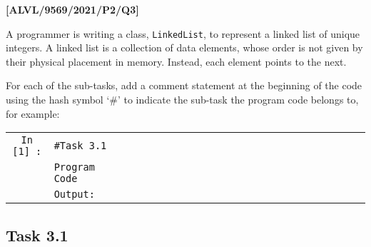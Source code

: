 \item \textbf{{[}ALVL/9569/2021/P2/Q3{]} }

A programmer is writing a class, \texttt{LinkedList}, to represent
a linked list of unique integers. A linked list is a collection of
data elements, whose order is not given by their physical placement
in memory. Instead, each element points to the next.

For each of the sub-tasks, add a comment statement at the beginning
of the code using the hash symbol \textquoteleft \#' to indicate the
sub-task the program code belongs to, for example:

\begin{singlespace}
\noindent \texttt{}%
\begin{tabular}{c|lcccccccccccccccccccccc|}
\cline{2-24} \cline{3-24} \cline{4-24} \cline{5-24} \cline{6-24} \cline{7-24} \cline{8-24} \cline{9-24} \cline{10-24} \cline{11-24} \cline{12-24} \cline{13-24} \cline{14-24} \cline{15-24} \cline{16-24} \cline{17-24} \cline{18-24} \cline{19-24} \cline{20-24} \cline{21-24} \cline{22-24} \cline{23-24} \cline{24-24} 
\texttt{In {[}1{]} :} & \texttt{\#Task 3.1} &  &  &  &  &  &  &  &  &  &  &  &  &  &  &  &  &  &  &  &  &  & \tabularnewline
 & \texttt{Program Code} &  &  &  &  &  &  &  &  &  &  &  &  &  &  &  &  &  &  &  &  &  & \tabularnewline
\cline{2-24} \cline{3-24} \cline{4-24} \cline{5-24} \cline{6-24} \cline{7-24} \cline{8-24} \cline{9-24} \cline{10-24} \cline{11-24} \cline{12-24} \cline{13-24} \cline{14-24} \cline{15-24} \cline{16-24} \cline{17-24} \cline{18-24} \cline{19-24} \cline{20-24} \cline{21-24} \cline{22-24} \cline{23-24} \cline{24-24} 
\multicolumn{1}{c}{} & \texttt{Output:} &  &  &  &  &  &  &  &  &  &  &  &  &  &  &  &  &  &  &  &  &  & \multicolumn{1}{c}{}\tabularnewline
\end{tabular}
\end{singlespace}

\subsection*{Task 3.1 }

